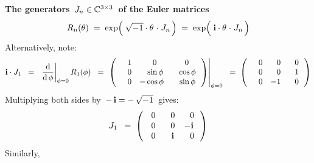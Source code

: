 \vskip 0.5cm
\noindent
\textbf{The generators \,$J_{n} \in \mathbb{C}^{3 \times 3}$\, of the Euler matrices}
\begin{equation*}
R_{n}(\theta)
\; = \;
	\exp\!\left(\;\sqrt{-1}\cdot\theta \overset{{\color{white}1}}{\cdot} J_{n}\,\right)
\; = \;
	\exp\!\left(\;\i\cdot\theta \overset{{\color{white}1}}{\cdot} J_{n}\,\right)
\end{equation*}
Alternatively, note:
\begin{equation*}
\i \cdot J_{1}
\;\; = \;\;
	\left.\dfrac{\d}{\d\,\phi}\right\vert_{\phi = 0} R_{1}(\phi)
\;\; = \;
	\left.\left(\,
		\begin{array}{ccc}
			{\color{white}-}1 & {\color{white}-}0 & {\color{white}-}0 \\
			{\color{white}-}0 & {\color{white}-}\sin\phi & {\color{white}-}\cos\phi \\
			{\color{white}-}0 & {\color{black}-}\cos\phi & {\color{white}-}\sin\phi \\
			\end{array}
		\,\right)\right\vert_{\phi = 0}
\;\; = \;
	\left(\,
		\begin{array}{ccc}
			{\color{white}-}0 & {\color{white}-}0 & {\color{white}-}0 \\
			{\color{white}-}0 & {\color{white}-}0 & {\color{white}-}1 \\
			{\color{white}-}0 & {\color{black}-}1 & {\color{white}-}0 \\
			\end{array}
		\,\right)
\end{equation*}
Multiplying both sides by \,$-\,\textnormal{\bf i} = -\,\sqrt{-1}$\, gives:
\begin{equation*}
J_{1}
\;\; = \;
	\left(\!\!
		\begin{array}{ccc}
			{\color{white}-}0 & {\color{white}-}0 & {\color{white}-}0 \\
			{\color{white}-}0 & {\color{white}-}0 & {\color{black}-}\i \\
			{\color{white}-}0 & {\color{white}-}\i & {\color{white}-}0 \\
			\end{array}
		\,\right)
\end{equation*}
Similarly,
